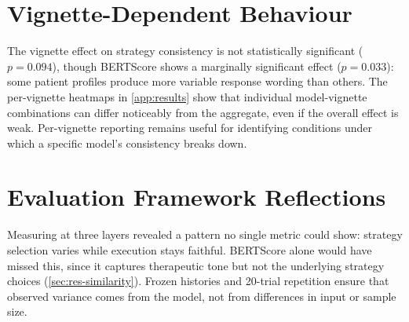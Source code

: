 \section{Vignette-Dependent Behaviour}
\label{sec:disc-vignettes}

The vignette effect on strategy consistency is not statistically
significant ($p = 0.094$), though BERTScore shows a marginally
significant effect ($p = 0.033$): some patient profiles produce more
variable response wording than others. The per-vignette heatmaps in
\autoref{app:results} show that individual model-vignette combinations
can differ noticeably from the aggregate, even if the overall effect is
weak. Per-vignette reporting remains useful for identifying conditions
under which a specific model's consistency breaks down.



\section{Evaluation Framework Reflections}
\label{sec:disc-framework-design}

Measuring at three layers revealed a pattern no single metric could
show: strategy selection varies while execution stays faithful. BERTScore alone would have missed this,
since it captures therapeutic tone but not the underlying strategy choices
(\autoref{sec:res-similarity}). Frozen histories and 20-trial repetition
\parencite{WA4QD3UE} ensure that observed variance comes from the model,
not from differences in input or sample size.

